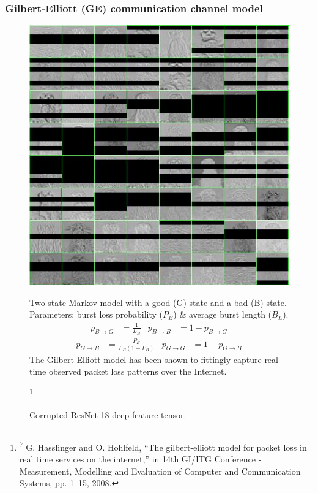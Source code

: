 \documentclass[aspectratio=169]{beamer}
\newcommand\blfootnote[1]{%
	\begingroup
	\renewcommand\thefootnote{}\footnote{#1}%
	\addtocounter{footnote}{-1}%
	\endgroup
}
\begin{document}
\begin{frame}
	\frametitle{Gilbert-Elliott (GE) communication channel model}
		\begin{figure}
		\begin{minipage}{.37\textwidth}
			\includegraphics[width=0.77\linewidth]{tileddamagedgridm.jpg}
			\caption{Corrupted ResNet-18 deep feature tensor.}
		\end{minipage}\hfill
		\begin{minipage}{.6\textwidth}
		\small Two-state Markov model with a good (G) state and a bad (B) state. Parameters: burst loss probability ($P_B$) \& average burst length ($B_L$).
			\begin{align}
p_{B\to G} & = \frac{1}{L_B} & p_{B\to B} & =1-p_{B\to G} \label{eq:ge:1}
\end{align}
\begin{align}
p_{G\to B} & = \frac{P_B}{L_B(1-P_B)} & p_{G\to G} & = 1-p_{G\to B} \label{eq:ge:2}
\end{align}
\small 	The Gilbert-Elliott model has been shown to fittingly \mbox{capture} real-time observed packet loss patterns over the \mbox{Internet}. \cite{5755057}
		\end{minipage}
		\blfootnote{\tiny \textsuperscript{7} G. Hasslinger and O. Hohlfeld, “The gilbert-elliott model for packet loss in real time services on the internet,” in 14th GI/ITG Conference - Measurement, Modelling and Evaluation of Computer and Communication Systems, pp. 1–15, 2008.} 
	\end{figure}
\end{frame}
\end{document}
